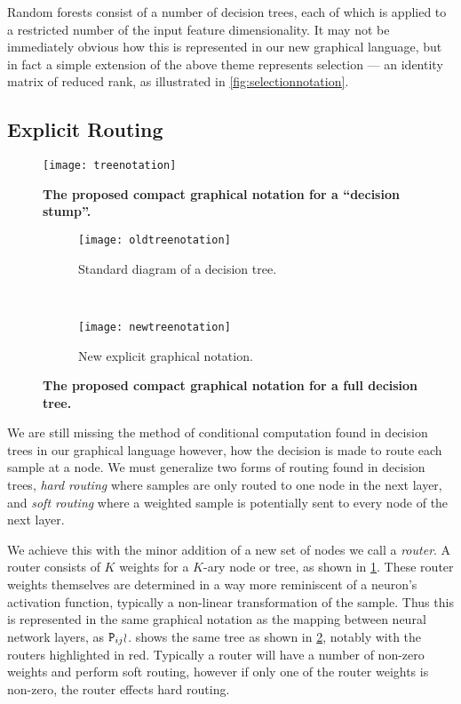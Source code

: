 \documentclass[thesis]{subfiles}
\begin{document}
	Random forests consist of a number of decision trees, each of which is applied to a restricted number of the input feature dimensionality. It may not be immediately obvious how this is represented in our new graphical language, but in fact a simple extension of the above theme represents selection --- \ie an identity matrix of reduced rank, as illustrated in \cref{fig:selectionnotation}.
	
	\subsection{Explicit Routing}
	\begin{figure}[htbp!] 
		\centering
		\texttt{[image: treenotation]}
		\caption[Proposed graphical notation for a decision stump]{\textbf{The proposed compact graphical notation for a ``decision stump''.}}\label{fig:treeNotation}
	\end{figure}
	
	\begin{figure}[tbp] 
		\centering
		\begin{subfigure}[b]{0.4\textwidth}
			\centering
			\texttt{[image: oldtreenotation]}
			\caption{Standard diagram of a decision tree.}\label{fig:oldtreenotation}
		\end{subfigure}
		~
		\begin{subfigure}[b]{0.4\textwidth}
			\centering
			\texttt{[image: newtreenotation]}
			\caption{New explicit graphical notation.}\label{fig:newtreenotation}
		\end{subfigure}
		\caption[Proposed compact graphical notation for a decision tree]{\textbf{The proposed compact graphical notation for a full decision tree.}}\label{fig:complexDecisionTree}
	\end{figure}
	
	We are still missing the method of conditional computation found in decision trees in our graphical language however, \ie how the decision is made to route each sample at a node. We must generalize two forms of routing found in decision trees, \emph{hard routing} where samples are only routed to one node in the next layer, and \emph{soft routing} where a weighted sample is potentially sent to every node of the next layer.
	
	We achieve this with the minor addition of a new set of nodes we call a \emph{router}. A router consists of $K$ weights for a $K$-ary node or tree, as shown in \cref{fig:treeNotation}. These router weights themselves are determined in a way more reminiscent of a neuron's activation function, typically a non-linear transformation of the sample. Thus this is represented in the same graphical notation as the mapping between neural network layers, \ie as $\mat P_{ij} \wr$.  shows the same tree as shown in \cref{fig:oldtreenotation}, notably with the routers highlighted in red. Typically a router will have a number of non-zero weights and perform soft routing, however if only one of the router weights is non-zero, the router effects hard routing.
	
\end{document}
